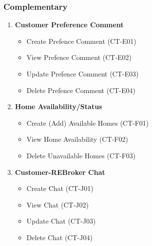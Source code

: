 \documentclass[11pt]{article}
\begin{document}
			\subsubsection{Complementary}
				\begin{enumerate}[i]
					\item \textbf{Customer Preference Comment}
					\begin{itemize}
						\item Create Prefence Comment (CT-E01)
						\item View Prefence Comment (CT-E02)
						\item Update Prefence Comment (CT-E03)
						\item Delete Prefence Comment (CT-E04)
					\end{itemize}
					
					\item \textbf{Home Availability/Status}
					\begin{itemize}
						\item Create (Add) Available Homes (CT-F01)
						\item View Home Availability (CT-F02)
						\item Delete Unavailable Homes (CT-F03)
					\end{itemize}
					
					\item \textbf{Customer-REBroker Chat}
					\begin{itemize}
						\item Create Chat (CT-J01)
						\item View Chat (CT-J02)
						\item Update Chat (CT-J03)
						\item Delete Chat (CT-J04)
					\end{itemize}
				\end{enumerate}
		
\end{document}
